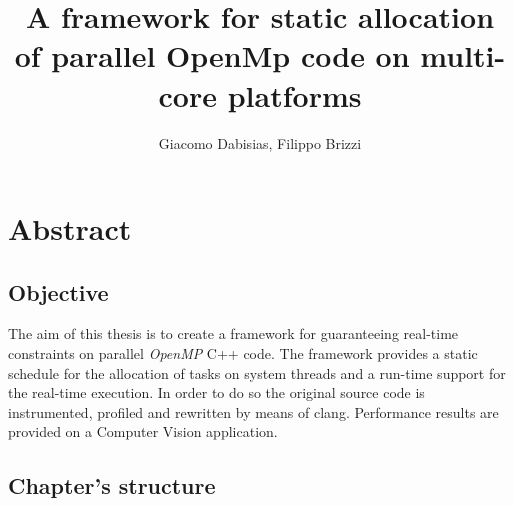 \documentclass[a4paper,11pt,oneside]{book}
\author{Giacomo Dabisias, Filippo Brizzi}
\title{A framework for static allocation of parallel OpenMp code on multi-core platforms}
\begin{document}
\frontmatter
\tableofcontents

\chapter{Abstract}

\section{Objective}
The aim of this thesis is to create a framework for guaranteeing real-time constraints on parallel \emph{OpenMP} C++ code. The framework provides a static schedule for the allocation of tasks on system threads and a run-time support for the real-time execution. In order to do so the original source code is instrumented, profiled and rewritten by means of clang. Performance results are provided on a Computer Vision application.

\section{Chapter's structure}


\mainmatter
\end{document}
